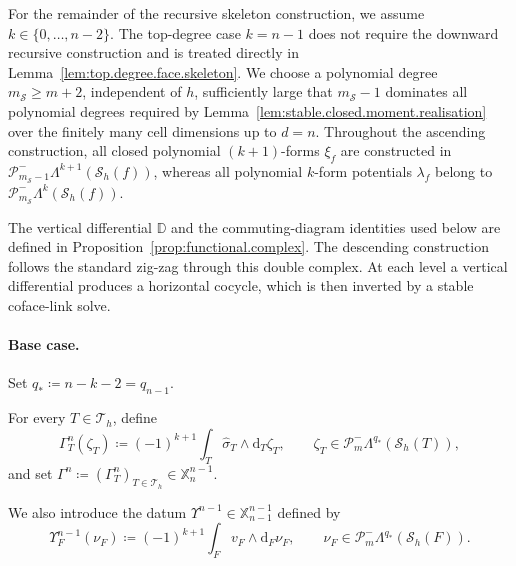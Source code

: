 \documentclass[a4paper,11pt]{article}
\theoremstyle{definition}
\newcommand{\DIFF}{\mathrm{d}}
\newcommand{\Sh}{\mathcal{S}_h}
\newcommand{\PLtrim}[2]{\mathcal{P}_{#1}^{-}\Lambda^{#2}}
\begin{document}
For the remainder of the recursive skeleton construction, we assume $k\in\{0,\ldots,n-2\}$.
The top-degree case $k=n-1$ does not require the downward recursive construction and is treated directly in Lemma~\ref{lem:top.degree.face.skeleton}.
We choose a polynomial degree $m_{\mathcal S}\geq m+2$, independent of $h$, sufficiently large that $m_{\mathcal S}-1$ dominates all polynomial degrees required by Lemma~\ref{lem:stable.closed.moment.realisation} over the finitely many cell dimensions up to $d=n$.
Throughout the ascending construction, all closed polynomial $(k+1)$-forms $\xi_f$ are constructed in $\PLtrim{m_{\mathcal S}-1}{k+1}(\Sh(f))$, whereas all polynomial $k$-form potentials $\lambda_f$ belong to $\PLtrim{m_{\mathcal S}}{k}(\Sh(f))$.

The vertical differential $\mathbb D$ and the commuting-diagram identities used below are defined in Proposition~\ref{prop:functional.complex}.
The descending construction follows the standard zig-zag through this double complex.
At each level a vertical differential produces a horizontal cocycle, which is then inverted by a stable coface-link solve.

\paragraph{Base case.}

Set $q_* \coloneqq n-k-2 = q_{n-1}$.

For every $T\in\mathcal T_h$, define
\[
  \Gamma_T^n(\zeta_T)
  \coloneqq
  (-1)^{k+1}
  \int_T
  \widehat\sigma_T\wedge\DIFF_T\zeta_T,
  \qquad
  \zeta_T\in
  \PLtrim{m}{q_*}(\Sh(T)),
\]
and set $\Gamma^n \coloneqq (\Gamma_T^n)_{T\in\mathcal T_h} \in \mathbb X_n^{n-1}$.

We also introduce the datum $\Upsilon^{n-1}\in\mathbb X_{n-1}^{n-1}$ defined by
\[
  \Upsilon_F^{n-1}(\nu_F)
  \coloneqq
  (-1)^{k+1}
  \int_F
  v_F\wedge\DIFF_F\nu_F,
  \qquad
  \nu_F\in
  \PLtrim{m}{q_*}(\Sh(F)).
\]
\end{document}
